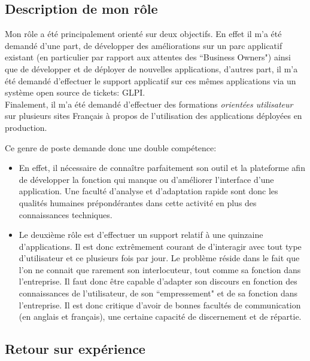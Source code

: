 \subsection{Description de mon rôle}

Mon rôle a été principalement orienté sur deux objectifs. En effet il m'a été demandé d'une part, de développer des améliorations sur un parc applicatif existant (en particulier par rapport aux attentes des ``Business Owners") ainsi que de développer et de déployer de nouvelles applications, d'autres part, il m'a été demandé d'effectuer le support applicatif sur ces mêmes applications via un système open source de tickets: GLPI.\\
Finalement, il m'a été demandé d'effectuer des formations \emph{orientées utilisateur} sur plusieurs sites Français à propos de l'utilisation des applications déployées en production.

Ce genre de poste demande donc une double compétence:

\begin{itemize}\itemsep7pt

	\item En effet, il nécessaire de connaître parfaitement son outil et la plateforme afin de développer la fonction qui manque ou d'améliorer l'interface d'une application. Une faculté d'analyse et d'adaptation rapide sont donc les qualités humaines prépondérantes dans cette activité en plus des connaissances techniques.
	
	\item Le deuxième rôle est d'effectuer un support relatif à une quinzaine d'applications. Il est donc extrêmement courant de d'interagir avec tout type d'utilisateur et ce plusieurs fois par jour. Le problème réside dans le fait que l'on ne connait que rarement son interlocuteur, tout comme sa fonction dans l'entreprise. Il faut donc être capable d'adapter son discours en fonction des connaissances de l'utilisateur, de son ``empressement" et de sa fonction dans l'entreprise. Il est donc critique d'avoir de bonnes facultés de communication (en anglais et français), une certaine capacité de discernement et de répartie.
	
\end{itemize} 

\clearpage

\subsection{Retour sur expérience}

